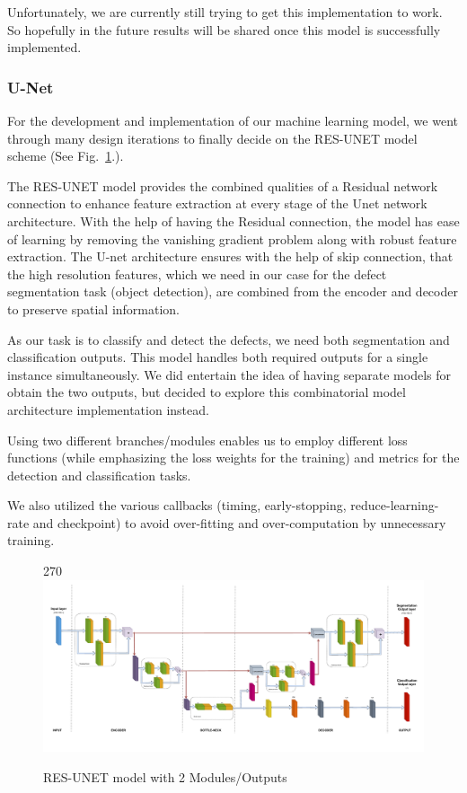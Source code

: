 \documentclass[12pt]{article}
\begin{document}
Unfortunately, we are currently still trying to get this implementation to work. So hopefully in the future results will be shared once this model is successfully implemented. 

\clearpage
\newpage

\subsubsection{U-Net}
For the development and implementation of our machine learning model, we went through many design iterations to finally decide on the RES-UNET model scheme (See Fig.~\ref{fig:resunetmodel}.).

The RES-UNET model provides the combined qualities of a Residual network connection to enhance feature extraction at every stage of the Unet network architecture. With the help of having the Residual connection, the model has ease of learning by removing the vanishing gradient problem along with robust feature extraction. The U-net architecture ensures with the help of skip connection, that the high resolution features, which we need in our case for the defect segmentation task (object detection), are combined from the encoder and decoder to preserve spatial information.

As our task is to classify and detect the defects, we need both segmentation and classification outputs. This model handles both required outputs for a single instance simultaneously. We did entertain the idea of having separate models for obtain the two outputs, but decided to explore this combinatorial model architecture implementation instead.

Using two different branches/modules enables us to employ different loss functions (while emphasizing the loss weights for the training) and metrics for the detection and classification tasks.

We also utilized the various callbacks (timing, early-stopping, reduce-learning-rate and checkpoint) to avoid over-fitting and over-computation by unnecessary training. 

\begin{figure}[p]
    \centering
    \begin{turn}{270}
    \includegraphics[width=1.2\paperwidth,height=1.2\paperheight,keepaspectratio]{./graphics/model-unet.png}
    \end{turn}
    \caption{RES-UNET model with 2 Modules/Outputs}
    \label{fig:resunetmodel}
\end{figure}
\restoregeometry
\end{document}
